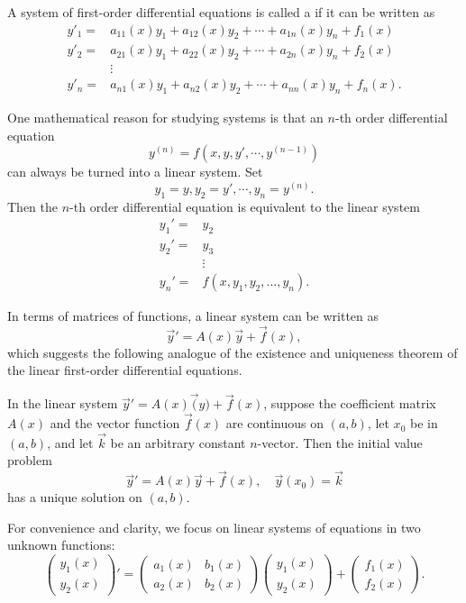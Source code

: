 A system of first-order differential equations is called a  if it can be written as
\[
  \begin{aligned}
    y'_1=&a_{11}(x)y_1+a_{12}(x)y_2+\cdots+a_{1n}(x)y_n+f_1(x)\\ 
    y'_2=&a_{21}(x)y_1+a_{22}(x)y_2+\cdots+a_{2n}(x)y_n+f_2(x)\\
    &\vdots\\ 
    y'_n=&a_{n1}(x)y_1+a_{n2}(x)y_2+\cdots+a_{nn}(x)y_n+f_n(x).
  \end{aligned}
\]

One mathematical reason for studying systems is that an $n$-th order differential equation
\[y^{(n)}=f(x, y, y',\cdots, y^{(n-1)})\]
can always be turned into a linear system. Set
\[y_1=y, y_2=y', \cdots, y_n=y^{(n)}.\]
Then the $n$-th order differential equation is equivalent to the linear system
\[
  \begin{aligned}
    y_{1}'=&y_2 \\
    y_{2}'=&y_3\\
    & \vdots \\
    y_{n}'=&f\left(x, y_{1}, y_{2}, \ldots, y_{n}\right).
    \end{aligned}  
\]

In terms of matrices of functions, a linear system can be written as
\[\vec{y}'=A(x)\vec{y}+\vec{f}(x),\]
which suggests the following analogue of the existence and uniqueness theorem of the linear first-order differential equations.

\begin{theorem}
  In the linear system $\vec{y}'=A(x)\vec(y)+\vec{f}(x)$,
suppose the coefficient matrix $A(x)$ and the vector function $\vec{f}(x)$ are continuous on $(a,b)$, let $x_0$ be in $(a,b)$, and let $\vec{k}$ be an arbitrary constant $n$-vector. Then the initial value problem
    \[\vec{y}'=A(x)\vec{y}+\vec{f}(x), \quad \vec{y}(x_0)=\vec{k} \nonumber\]
  has a unique solution on $(a,b)$.
\end{theorem}

For convenience and clarity, we focus on linear systems of equations in two
unknown functions:
\begin{equation}\label{eq:hom-linear-two}
  \begin{pmatrix}
    y_1(x) \\ y_2(x)
  \end{pmatrix}'=
  \begin{pmatrix}
    a_1(x) & b_1(x)\\
    a_2(x) & b_2(x)
  \end{pmatrix}
  \begin{pmatrix}
    y_1(x) \\ y_2(x)
  \end{pmatrix}
  +
  \begin{pmatrix}
    f_1(x)\\ f_2(x)
  \end{pmatrix}.
\end{equation}

